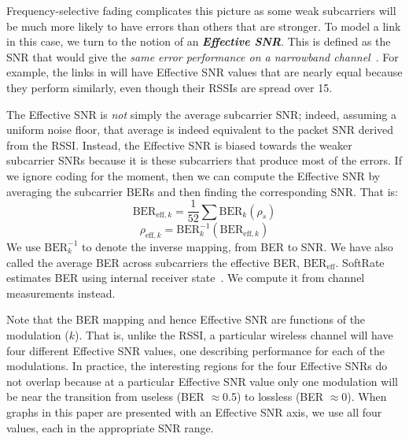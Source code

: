 Frequency-selective fading complicates this picture as some weak subcarriers will be much more likely to have errors than others that are stronger. To model a link in this case, we turn to the notion of an \textbf{\em Effective SNR}\@. This is defined as the SNR that would give the \emph{same error performance on a narrowband channel}~\cite{Nanda_EffectiveSNR}. For example, the links in  will have Effective SNR values that are nearly equal because they perform similarly, even though their RSSIs are spread over 15\dB.

The Effective SNR is \emph{not} simply the average subcarrier SNR; indeed, assuming a uniform noise floor, that average is indeed equivalent to the packet SNR derived from the RSSI\@. Instead, the Effective SNR is biased towards the weaker subcarrier SNRs because it is these subcarriers that produce most of the errors. If we ignore coding for the moment, then we can compute the Effective SNR by averaging the subcarrier BERs and then finding the corresponding SNR\@. That is:
\begin{equation}
\label{eq:effective_ber}
	\text{BER}_{\text{eff},k} = \frac{1}{52} \sum \text{BER}_k(\rho_s)
\end{equation}
\begin{equation}
\label{eq:effective_snr}
	\rho_{\text{eff},k} = \text{BER}_k^{-1}(\text{BER}_{\text{eff},k})
\end{equation}
We use $\text{BER}_k^{-1}$ to denote the inverse mapping, from BER to SNR\@. We have also called the average BER across subcarriers the effective BER, $\text{BER}_{\text{eff}}$. SoftRate estimates BER using internal receiver state~\cite{Vutukuru_SoftRate}. We compute it from channel measurements instead.

Note that the BER mapping and hence Effective SNR are functions of the modulation ($k$). That is, unlike the RSSI, a particular wireless channel will have four different Effective SNR values, one describing performance for each of the modulations. In practice, the interesting regions for the four Effective SNRs do not overlap because at a particular Effective SNR value only one modulation will be near the transition from useless (BER $\approx$0.5) to lossless (BER $\approx$0). When graphs in this paper are presented with an Effective SNR axis, we use all four values, each in the appropriate SNR range.

